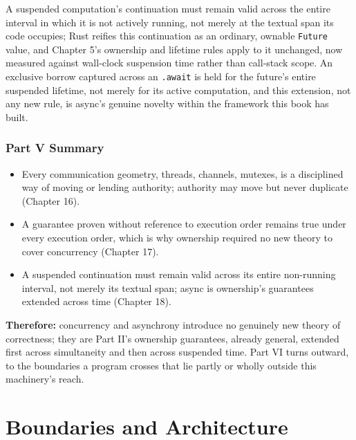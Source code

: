 \documentclass[11pt]{book}
\begin{document}
\begin{invariantbox}
A suspended computation's continuation must remain valid across the entire interval in which it is not actively running, not merely at the textual span its code occupies; Rust reifies this continuation as an ordinary, ownable \texttt{Future} value, and Chapter 5's ownership and lifetime rules apply to it unchanged, now measured against wall-clock suspension time rather than call-stack scope. An exclusive borrow captured across an \texttt{.await} is held for the future's entire suspended lifetime, not merely for its active computation, and this extension, not any new rule, is async's genuine novelty within the framework this book has built.
\end{invariantbox}

\clearpage

\clearpage

\section*{Part V Summary}

\begin{itemize}
\item Every communication geometry, threads, channels, mutexes, is a disciplined way of moving or lending authority; authority may move but never duplicate (Chapter 16).
\item A guarantee proven without reference to execution order remains true under every execution order, which is why ownership required no new theory to cover concurrency (Chapter 17).
\item A suspended continuation must remain valid across its entire non-running interval, not merely its textual span; async is ownership's guarantees extended across time (Chapter 18).
\end{itemize}

\noindent\textbf{Therefore:} concurrency and asynchrony introduce no genuinely new theory of correctness; they are Part II's ownership guarantees, already general, extended first across simultaneity and then across suspended time. Part VI turns outward, to the boundaries a program crosses that lie partly or wholly outside this machinery's reach.



\clearpage

\part{Boundaries and Architecture}
\end{document}

